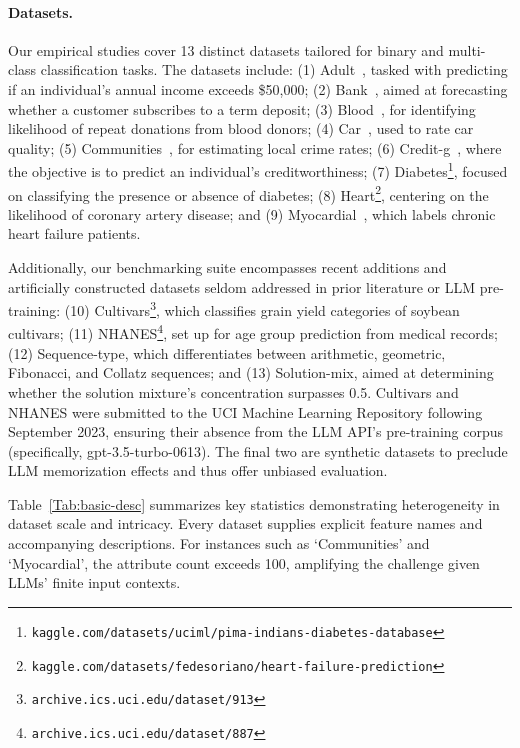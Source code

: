 \paragraph{Datasets.}
Our empirical studies cover 13 distinct datasets tailored for binary and multi-class classification tasks. The datasets include: (1) Adult~\cite{asuncion2007uci}, tasked with predicting if an individual’s annual income exceeds \$50,000; (2) Bank~\cite{moro2014data}, aimed at forecasting whether a customer subscribes to a term deposit; (3) Blood~\cite{yeh2009knowledge}, for identifying likelihood of repeat donations from blood donors; (4) Car~\cite{kadra2021well}, used to rate car quality; (5) Communities~\cite{misc_communities_and_crime_183}, for estimating local crime rates; (6) Credit-g~\cite{kadra2021well}, where the objective is to predict an individual’s creditworthiness; (7) Diabetes\footnote{\texttt{kaggle.com/datasets/uciml/pima-indians-diabetes-database}}, focused on classifying the presence or absence of diabetes; (8) Heart\footnote{\texttt{kaggle.com/datasets/fedesoriano/heart-failure-prediction}}, centering on the likelihood of coronary artery disease; and (9) Myocardial~\cite{misc_myocardial_infarction_complications_579}, which labels chronic heart failure patients.

Additionally, our benchmarking suite encompasses recent additions and artificially constructed datasets seldom addressed in prior literature or LLM pre-training: (10) Cultivars\footnote{\texttt{archive.ics.uci.edu/dataset/913}}, which classifies grain yield categories of soybean cultivars; (11) NHANES\footnote{\texttt{archive.ics.uci.edu/dataset/887}}, set up for age group prediction from medical records; (12) Sequence-type, which differentiates between arithmetic, geometric, Fibonacci, and Collatz sequences; and (13) Solution-mix, aimed at determining whether the solution mixture’s concentration surpasses 0.5. Cultivars and NHANES were submitted to the UCI Machine Learning Repository following September 2023, ensuring their absence from the LLM API’s pre-training corpus (specifically, gpt-3.5-turbo-0613). The final two are synthetic datasets to preclude LLM memorization effects and thus offer unbiased evaluation.

Table~\ref{Tab:basic-desc} summarizes key statistics demonstrating heterogeneity in dataset scale and intricacy. Every dataset supplies explicit feature names and accompanying descriptions. For instances such as `Communities' and `Myocardial', the attribute count exceeds 100, amplifying the challenge given LLMs’ finite input contexts.

